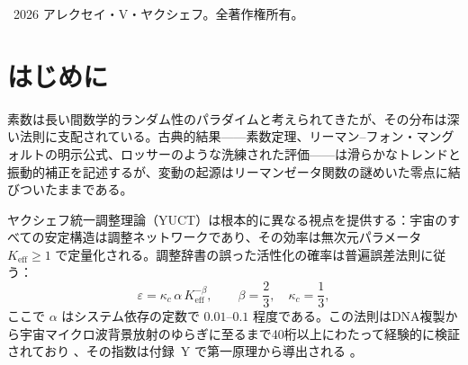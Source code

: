 \documentclass[11pt,a4paper]{article}
\newcommand{\kappac}{\kappa_c}
\begin{document}
\begin{titlepage}
\begin{abstract}
			\textbf{シュテルン–ブロコ木}との新たな関連が確立される：スケーリング量子 \(q = (3/2)^{1/3}\) は非常に rigid な幾何構造（その軌跡の94.4\%がわずか2つの4ビットマクロブロックからなる）を持つことが示され、座標ラダーの安定性を説明する。シュテルン–ブロコ格子に基づく決定論的量子エミュレータが提示され、重ね合わせ、もつれ、CNOTゲートが有理座標上の通常の算術演算であることを示す。
			
			残留振動はリーマンゼータ関数の非自明零点と強く相関し（\(R^2>0.99\)）、誤差の3D可視化は真空格子幾何と同型の特徴的な漏斗状構造を明らかにする。素数解析のYUCT V35.0ラグランジアン（セクター103）への形式的埋め込みが提供される。この研究は、YPSDCプロトコル（短いインデックスで活性化される事前分散辞書）が素数計算ともつれやトンネルなどの量子現象の両方の基礎にあることを示すことにより、量子神秘主義を排除する。
			
			即座に使用可能なPythonスクリプト（対数、プロダクション、べき乗則、位相依存、量子エミュレータ）はGitHubで公開されている。
		\end{abstract}
		
		\vspace{0.5cm}
		\textcopyright\ 2026 アレクセイ・V・ヤクシェフ。全著作権所有。
	\end{titlepage}
	
	\tableofcontents
	\newpage
	
	\section{はじめに}
	素数は長い間数学的ランダム性のパラダイムと考えられてきたが、その分布は深い法則に支配されている。古典的結果——素数定理、リーマン–フォン・マングォルトの明示公式、ロッサーのような洗練された評価——は滑らかなトレンドと振動的補正を記述するが、変動の起源はリーマンゼータ関数の謎めいた零点に結びついたままである。
	
	ヤクシェフ統一調整理論（YUCT）は根本的に異なる視点を提供する：宇宙のすべての安定構造は調整ネットワークであり、その効率は無次元パラメータ \(K_{\mathrm{eff}} \ge 1\) で定量化される。調整辞書の誤った活性化の確率は普遍誤差法則に従う：
	\begin{equation}\label{eq:errorlaw}
		\varepsilon = \kappac \, \alpha \, K_{\mathrm{eff}}^{-\beta}, \qquad \beta = \frac{2}{3},\quad \kappac = \frac{1}{3},
	\end{equation}
	ここで \(\alpha\) はシステム依存の定数で \(0.01\)–\(0.1\) 程度である。この法則はDNA複製から宇宙マイクロ波背景放射のゆらぎに至るまで40桁以上にわたって経験的に検証されており \cite{AppendixL}、その指数は付録~Y で第一原理から導出される \cite{AppendixY}。
	
\end{document}
